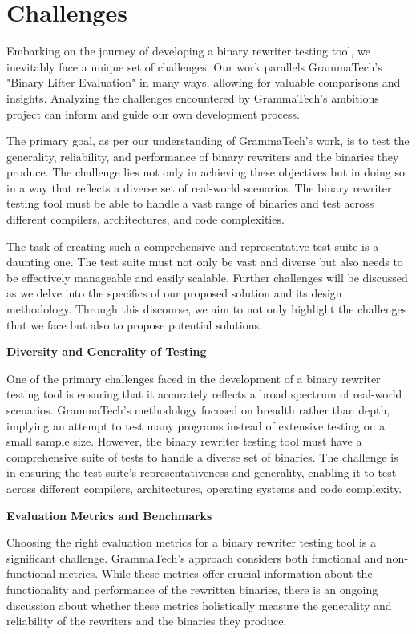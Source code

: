 \documentclass[a4paper,11pt,oneside]{report}
\begin{document}
\chapter{Challenges}

\setlength{\parindent}{4em}
Embarking on the journey of developing a binary rewriter testing tool, we inevitably
face a unique set of challenges. Our work parallels GrammaTech's "Binary Lifter Evaluation"
in many ways, allowing for valuable comparisons and insights. Analyzing the challenges
encountered by GrammaTech's ambitious project can inform and guide our own
development process.

The primary goal, as per our understanding of GrammaTech's work, is to test the
generality, reliability, and performance of binary rewriters and the binaries they produce.
The challenge lies not only in achieving these objectives but in doing so in a way that reflects
a diverse set of real-world scenarios. The binary rewriter testing tool must be able to handle
a vast range of binaries and test across different compilers, architectures, and code
complexities.

The task of creating such a comprehensive and representative test suite is a daunting
one. The test suite must not only be vast and diverse but also needs to be effectively
manageable and easily scalable. Further challenges will be discussed as we delve into the
specifics of our proposed solution and its design methodology. Through this discourse, we
aim to not only highlight the challenges that we face but also to propose potential solutions.

\textbf{Diversity and Generality of Testing}

One of the primary challenges faced in the development of a binary rewriter testing
tool is ensuring that it accurately reflects a broad spectrum of real-world scenarios.
GrammaTech's methodology focused on breadth rather than depth, implying an attempt to
test many programs instead of extensive testing on a small sample size. However, the binary
rewriter testing tool must have a comprehensive suite of tests to handle a diverse set of
binaries. The challenge is in ensuring the test suite's representativeness and generality,
enabling it to test across different compilers, architectures, operating systems and code
complexity.

\textbf{Evaluation Metrics and Benchmarks}

Choosing the right evaluation metrics for a binary rewriter testing tool is a significant
challenge. GrammaTech's approach considers both functional and non-functional metrics.
While these metrics offer crucial information about the functionality and performance of
the rewritten binaries, there is an ongoing discussion about whether these metrics
holistically measure the generality and reliability of the rewriters and the binaries they
produce.
\end{document}
